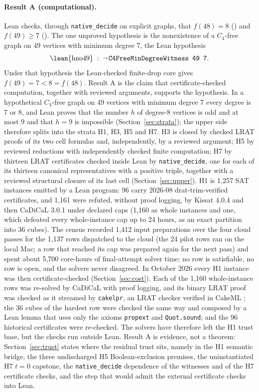 \documentclass{anvil-paper}
\newcommand{\hnoFortyNine}{\lean{hno49}}
\newcommand{\cakelpr}{\texttt{cake\textunderscore lpr}}
\theoremstyle{definition}
\begin{document}
\paragraph{Result A (computational).} Lean checks, through \texttt{native\_decide} on explicit graphs, that $f(48)=8$ () and $f(49)\ge 7$ (). The one unproved hypothesis is the nonexistence of a $C_4$-free graph on 49 vertices with minimum degree 7, the Lean hypothesis
\[
\text{\hnoFortyNine} \;:\; \neg\,\text{\texttt{C4FreeMinDegreeWitness 49 7}} .
\]
Under that hypothesis the Lean-checked finite-drop core gives $f(49)=7<8=f(48)$. Result A is the claim that certificate-checked computation, together with reviewed arguments, supports the hypothesis. In a hypothetical $C_4$-free graph on 49 vertices with minimum degree 7 every degree is 7 or 8, and Lean proves that the number $h$ of degree-8 vertices is odd and at most 9 and that $h=9$ is impossible (Section~\ref{sec:strata}); the upper side therefore splits into the strata H1, H3, H5 and H7. H3 is closed by checked LRAT proofs of its two cell formulas and, independently, by a reviewed argument; H5 by reviewed reductions with independently checked finite computation; H7 by thirteen LRAT certificates checked inside Lean by \texttt{native\_decide}, one for each of its thirteen canonical representatives with a positive triple, together with a reviewed structural closure of its last cell (Section~\ref{sec:upper}). H1 is 1,257 SAT instances emitted by a Lean program: 96 carry 2026-08 drat-trim-verified certificates, and 1,161 were refuted, without proof logging, by Kissat 4.0.4 and then CaDiCaL 3.0.1 under declared caps (1,160 as whole instances and one, which defeated every whole-instance cap up to 24 hours, as an exact partition into 36 cubes). The census recorded 1,412 input preparations over the four cloud passes for the 1,137 rows dispatched to the cloud (the 24 pilot rows ran on the local Mac; a row that reached its cap was prepared again for the next pass) and spent about 5,700 core-hours of final-attempt solver time; no row is satisfiable, no row is open, and the solvers never disagreed. In October 2026 every H1 instance was then certificate-checked (Section~\ref{sec:cost}). Each of the 1,160 whole-instance rows was re-solved by CaDiCaL with proof logging, and its binary LRAT proof was checked as it streamed by \cakelpr{}, an LRAT checker verified in CakeML \citep{tan2021cakelpr}; the 36 cubes of the hardest row were checked the same way and composed by a Lean lemma that uses only the axioms \texttt{propext} and \texttt{Quot.sound}; and the 96 historical certificates were re-checked. The solvers have therefore left the H1 trust base, but the checks run outside Lean. Result A is evidence, not a theorem: Section~\ref{sec:trust} states where the residual trust sits, namely in the H1 semantic bridge, the three undischarged H5 Boolean-exclusion premises, the uninstantiated H7 $t=0$ capstone, the \texttt{native\_decide} dependence of the witnesses and of the H7 certificate checks, and the step that would admit the external certificate checks into Lean.
\end{document}

